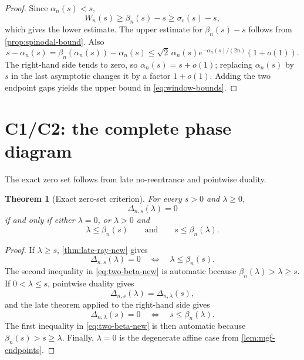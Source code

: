 \documentclass[11pt]{article}
\theoremstyle{plain}
\newtheorem{theorem}{Theorem}[section]
\theoremstyle{definition}
\theoremstyle{remark}
\begin{document}
\begin{proof}
Since \(\alpha_n(s)<s\),
\[
W_n(s)\ge\beta_n(s)-s\ge\sigma_{\mathrm c}(s)-s,
\]
which gives the lower estimate.  The upper estimate for \(\beta_n(s)-s\) follows from \cref{prop:spinodal-bound}.  Also
\[
s-\alpha_n(s)
=\beta_n(\alpha_n(s))-\alpha_n(s)
\le\sqrt2\,\alpha_n(s)e^{-\alpha_n(s)/(2n)}(1+o(1)).
\]
The right-hand side tends to zero, so \(\alpha_n(s)=s+o(1)\); replacing \(\alpha_n(s)\) by \(s\) in the last asymptotic changes it by a factor \(1+o(1)\).  Adding the two endpoint gaps yields the upper bound in \eqref{eq:window-bounds}.
\end{proof}

\section{C1/C2: the complete phase diagram}

The exact zero set follows from late no-reentrance and pointwise duality.

\begin{theorem}[Exact zero-set criterion]\label{thm:zero-criterion-new}
For every \(s>0\) and \(\lambda\ge0\),
\[
\Delta_{n,s}(\lambda)=0
\]
if and only if either \(\lambda=0\), or \(\lambda>0\) and
\begin{equation}\label{eq:two-beta-new}
\lambda\le\beta_n(s)
\qquad\text{and}\qquad
s\le\beta_n(\lambda).
\end{equation}
\end{theorem}

\begin{proof}
If \(\lambda\ge s\), \cref{thm:late-ray-new} gives
\[
\Delta_{n,s}(\lambda)=0
\quad\Longleftrightarrow\quad
\lambda\le\beta_n(s).
\]
The second inequality in \eqref{eq:two-beta-new} is automatic because \(\beta_n(\lambda)>\lambda\ge s\).  If \(0<\lambda\le s\), pointwise duality gives
\[
\Delta_{n,s}(\lambda)=\Delta_{n,\lambda}(s),
\]
and the late theorem applied to the right-hand side gives
\[
\Delta_{n,\lambda}(s)=0
\quad\Longleftrightarrow\quad
s\le\beta_n(\lambda).
\]
The first inequality in \eqref{eq:two-beta-new} is then automatic because \(\beta_n(s)>s\ge\lambda\).  Finally, \(\lambda=0\) is the degenerate affine case from \cref{lem:mgf-endpoints}.
\end{proof}
\end{document}
